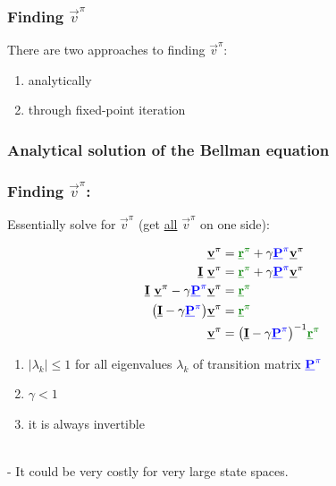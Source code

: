 \begin{frame}\frametitle{Finding $\vec v^\pi$}

There are two approaches to finding $\vec v^\pi$:

\begin{enumerate}
\item[\ref{sec:findvanalytical} -] analytically
\item[\ref{sec:findviter} -] through fixed-point iteration
\end{enumerate}

\end{frame}

\subsubsection{Analytical solution of the Bellman equation}\label{sec:findvanalytical}

\begin{frame}\frametitle{Finding $\vec v^\pi$:~\subsubsecname}

Essentially solve for $\vec v^\pi$ (get \underline{all} $\vec v^\pi$ on one side):

	\begin{align}
		\vec v^\pi &= {\color{reward}\vec r^\pi} 
		+ \gamma {\color{trans}\vec P^\pi} \vec v^\pi \\
		\vec I~\vec v^\pi 
        &= {\color{reward}\vec r^\pi}
		+ \gamma {\color{trans}\vec P^\pi} \vec v^\pi
	\\
		\vec I~\vec v^\pi - \gamma {\color{trans}\vec P^\pi} \vec v^\pi
		&= {\color{reward}\vec r^\pi}
	\\
		\big(\vec I - \gamma {\color{trans}\vec P^\pi}\big) \vec v^\pi
		&= {\color{reward}\vec r^\pi}
	\\
	\vec v^\pi &= \big(\vec I 
			- \gamma {\color{trans}\vec P^\pi}\big)^{-1}
		 {\color{reward}\vec r^\pi}
	\end{align}
	
		
\begin{enumerate}
\item $|\lambda_k| \leq 1$ for all eigenvalues 
				$\lambda_k$ of transition matrix ${\color{trans}\vec P^\pi}$
\item $\gamma < 1$
\item[$\Rightarrow$] it is always invertible
\end{enumerate}

\slidesonly{\vspace{-5mm}}

\\

\pause 
- It could be very costly for very large state spaces.

\end{frame}


